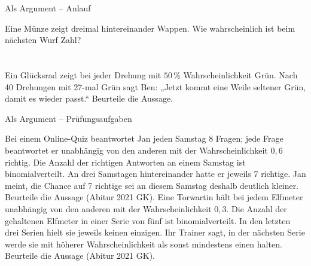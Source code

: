 \begin{aufgabe}{Als Argument – Anlauf}
\begin{teile}
\teil Eine Münze zeigt dreimal hintereinander Wappen. Wie wahrscheinlich ist beim nächsten Wurf Zahl? \\  \\  \\ 
\teil Ein Glücksrad zeigt bei jeder Drehung mit $50\,\%$ Wahrscheinlichkeit Grün. Nach 40 Drehungen mit 27-mal Grün sagt Ben: „Jetzt kommt eine Weile seltener Grün, damit es wieder passt.“ Beurteile die Aussage.
\end{teile}
\end{aufgabe}

\begin{aufgabe}{Als Argument – Prüfungsaufgaben}
\begin{teile}
\teil Bei einem Online-Quiz beantwortet Jan jeden Samstag 8 Fragen; jede Frage beantwortet er unabhängig von den anderen mit der Wahrscheinlichkeit $0{,}6$ richtig. Die Anzahl der richtigen Antworten an einem Samstag ist binomialverteilt. An drei Samstagen hintereinander hatte er jeweils 7 richtige. Jan meint, die Chance auf 7 richtige sei an diesem Samstag deshalb deutlich kleiner. Beurteile die Aussage \hfill (Abitur 2021 GK).
\teil Eine Torwartin hält bei jedem Elfmeter unabhängig von den anderen mit der Wahrscheinlichkeit $0{,}3$. Die Anzahl der gehaltenen Elfmeter in einer Serie von fünf ist binomialverteilt. In den letzten drei Serien hielt sie jeweils keinen einzigen. Ihr Trainer sagt, in der nächsten Serie werde sie mit höherer Wahrscheinlichkeit als sonst mindestens einen halten. Beurteile die Aussage \hfill (Abitur 2021 GK).
\end{teile}
\end{aufgabe}
